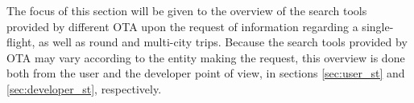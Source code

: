
The focus of this section will be given to the overview of the search tools provided by different OTA upon the request of information regarding a single-flight, as well as round and multi-city trips. 
Because the search tools provided by OTA may vary according to the entity making the request, this overview is done both from the user and the developer point of view, in sections \ref{sec:user_st} and \ref{sec:developer_st}, respectively.


